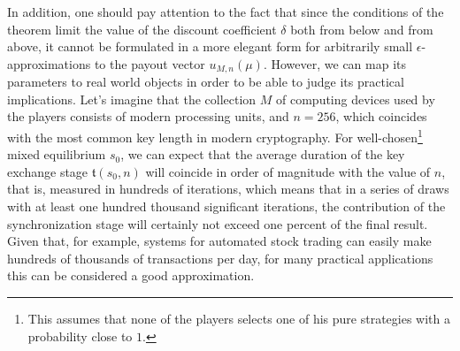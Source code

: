 In addition, one should pay attention to the fact that since the conditions of the theorem limit the value of the discount coefficient $\delta$ both from below and from above, it cannot be formulated in a more elegant form for arbitrarily small $\epsilon$-approximations to the payout vector $u_{M,n}(\mu)$. However, we can map its parameters to real world objects in order to be able to judge its practical implications. Let's imagine that the collection $M$ of computing devices used by the players consists of modern processing units, and $n = 256$, which coincides with the most common key length in modern cryptography. For well-chosen\footnote{This assumes that none of the players selects one of his pure strategies with a probability close to $1$.} mixed equilibrium $s_0$, we can expect that the average duration of the key exchange stage $\mathfrak{t}(s_0, n)$ will coincide in order of magnitude with the value of $n$, that is, measured in hundreds of iterations, which means that in a series of draws with at least one hundred thousand significant iterations, the contribution of the synchronization stage will certainly not exceed one percent of the final result. Given that, for example, systems for automated stock trading can easily make hundreds of thousands of transactions per day, for many practical applications this can be considered a good approximation. %

